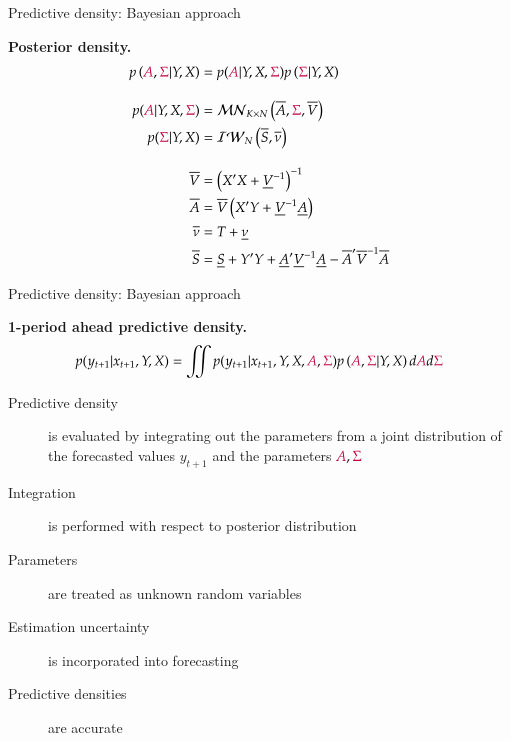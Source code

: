 \documentclass[notes,blackandwhite,mathsans,usenames,dvipsnames]{beamer}
\begin{document}
\begin{frame}{Predictive density: Bayesian approach}

\textbf{Posterior density.}
\begin{align*} 
p\left( {\color{purple}A}, {\color{purple}\Sigma}|Y,X \right) &= p({\color{purple}A}|Y,X,{\color{purple}\Sigma})p\left( {\color{purple}\Sigma}|Y,X \right)\\[2ex]
p({\color{purple}A}|Y,X,{\color{purple}\Sigma}) &= \mathcal{MN}_{K\times N}\left( \overline{A},{\color{purple}\Sigma},\overline{V} \right)\\
p({\color{purple}\Sigma}|Y,X) &= \mathcal{IW}_N\left( \overline{S}, \overline{\nu} \right)\\[2ex]
\overline{V}&= \left( X'X + \underline{V}^{-1}\right)^{-1} \\
\overline{A}&= \overline{V}\left( X'Y + \underline{V}^{-1}\underline{A} \right)\\
\overline{\nu}&= T+\underline{\nu}\\
\overline{S}&= \underline{S}+Y'Y + \underline{A}'\underline{V}^{-1}\underline{A} - \overline{A}'\overline{V}^{-1}\overline{A}
\end{align*} 

\end{frame}



\begin{frame}{Predictive density: Bayesian approach}

\textbf{1-period ahead predictive density.}\small
\begin{align*} 
p(y_{t+1}|x_{t+1},Y,X) = \iint p(y_{t+1}|x_{t+1},Y,X,{\color{purple}A},{\color{purple}\Sigma})p\left( {\color{purple}A}, {\color{purple}\Sigma}|Y,X \right) d{\color{purple}A}d {\color{purple}\Sigma}
\end{align*} 

\normalsize\bigskip
\begin{description}
\item[Predictive density]{\color{mcxs2} is evaluated by integrating out the parameters from a joint distribution of the forecasted values $y_{t+1}$ and the parameters ${\color{purple}A}, {\color{purple}\Sigma}$}
\item[Integration]{\color{mcxs2} is performed with respect to posterior distribution}
\item[Parameters]{\color{mcxs2}are treated as unknown random variables}
\item[Estimation uncertainty]{\color{mcxs2}is incorporated into forecasting}
\item[Predictive densities]{\color{mcxs2}are accurate}
\end{description}

\end{frame}
\end{document}
